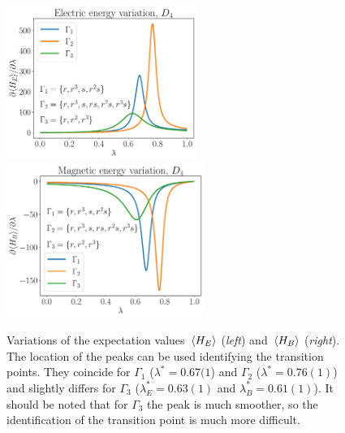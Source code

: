 \begin{figure}[h]
    \centering
    \includegraphics[height=5cm]{assets/graphs/elec_variations_D4.pdf}%
    \hfill%
    \includegraphics[height=5cm]{assets/graphs/magn_variations_D4.pdf}
    \caption[Electric and magnetic energy variations for $D_4$]{%
        Variations of the expectation values $\ev*{H_E}$ (\emph{left}) and $\ev*{H_B}$ (\emph{right}).
        The location of the peaks can be used identifying the transition points.
        They coincide for $\Gamma_1$ ($\lambda^{\ast} = 0.67(1$) and $\Gamma_2$ ($\lambda^{\ast} = 0.76(1)$) and slightly differs for $\Gamma_3$ ($\lambda_E^{\ast} = 0.63(1)$ and $\lambda_B^{\ast} = 0.61(1)$).
        It should be noted that for $\Gamma_3$ the peak is much smoother, so the identification of the transition point is much more difficult.
    }
    \label{fig:HE_HB_variation_D4}
\end{figure}



\clearpage

